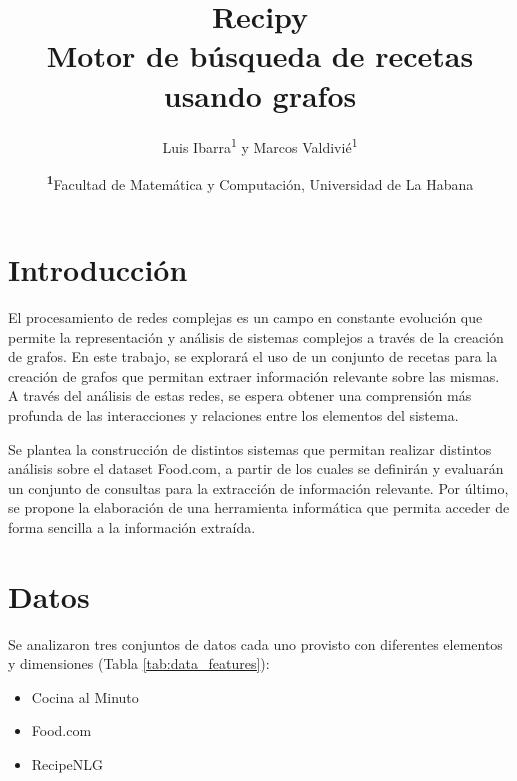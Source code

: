 \documentclass[
	a4paper, %
	10pt, %
	unnumberedsections, %
	twoside, %
]{LTJournalArticle}
\title{Recipy\\Motor de búsqueda de recetas usando grafos} %
\author{%
	Luis Ibarra\textsuperscript{1} y Marcos Valdivié\textsuperscript{1} 
}
\date{\footnotesize\textsuperscript{\textbf{1}}Facultad de Matemática y Computación, Universidad de La Habana}
\begin{document}
\maketitle %


\section{Introducción}

El procesamiento de redes complejas es un campo en constante evolución que permite la representación y análisis 
de sistemas complejos a través de la creación de grafos. En este trabajo, se explorará el uso de un conjunto de 
recetas para la creación de grafos que permitan extraer información relevante sobre las mismas. A través del 
análisis de estas redes, se espera obtener una comprensión más profunda de las interacciones y relaciones entre 
los elementos del sistema. 

Se plantea la construcción de distintos sistemas que permitan realizar distintos análisis sobre el dataset 
Food.com, a partir de los cuales se definirán y evaluarán un conjunto de consultas para la extracción de 
información relevante. Por último, se propone la elaboración de una herramienta informática que permita acceder 
de forma sencilla a la información extraída.



\section{Datos}

Se analizaron tres conjuntos de datos cada uno provisto con diferentes elementos y dimensiones
(Tabla \ref{tab:data_features}):

\begin{itemize}
	\item Cocina al Minuto
	\item Food.com \autocite{majumder2019generating}
	\item RecipeNLG \autocite{bien-etal-2020-recipenlg}
\end{itemize}
\end{document}
